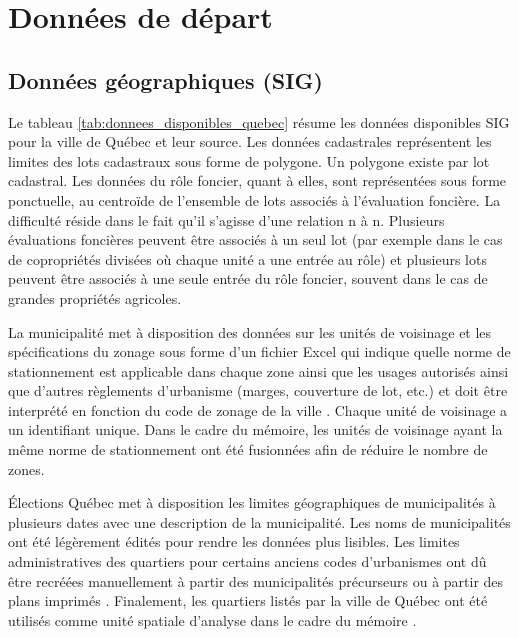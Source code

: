 \section{Données de départ}\label{sec:meth_donnees_dispo}
    \subsection{Données géographiques (SIG)}
        Le tableau \ref{tab:donnees_disponibles_quebec} résume les données disponibles \ac{SIG} pour la ville de Québec et leur source. Les données cadastrales\parencite{ministere_des_ressources_naturelles_et_des_forets_polygones_2023} représentent les limites des lots cadastraux sous forme de polygone. Un polygone existe par lot cadastral. Les données du rôle foncier, quant à elles,  sont représentées sous forme ponctuelle, au centroïde de l'ensemble de lots associés à l'évaluation foncière. La difficulté réside dans le fait qu'il s'agisse d'une relation n à n. Plusieurs évaluations foncières peuvent être associés à un seul lot (par exemple dans le cas de copropriétés divisées où chaque unité a une entrée au rôle) et plusieurs lots peuvent être associés à une seule entrée du rôle foncier, souvent dans le cas de grandes propriétés agricoles. \par
        La municipalité met à disposition des données sur les unités de voisinage \parencite{ville_de_quebec_zonage_2024} et les spécifications du zonage sous forme d'un fichier Excel qui indique quelle norme de stationnement est applicable dans chaque zone ainsi que les usages autorisés ainsi que d'autres règlements d'urbanisme (marges, couverture de lot, etc.) \parencite{ville_de_quebec_grille_2024} et doit être interprété en fonction du code de zonage de la ville \parencite{ville_de_quebec_rvq_2009}. Chaque unité de voisinage a un identifiant unique. Dans le cadre du mémoire, les unités de voisinage ayant la même norme de stationnement ont été fusionnées afin de réduire le nombre de zones.\par
        Élections Québec met à disposition les limites géographiques de municipalités \parencite{elections_quebec_atlas_2021} à plusieurs dates avec une description de la municipalité. Les noms de municipalités ont été légèrement édités pour rendre les données plus lisibles. Les limites administratives des quartiers pour certains anciens codes d'urbanismes ont dû être recréées manuellement à partir des municipalités précurseurs ou à partir des plans imprimés \parencite{ville_de_quebec_reglement_1995}. Finalement, les quartiers listés par la ville de Québec ont été utilisés comme unité spatiale d'analyse dans le cadre du mémoire \parencite{ville_de_quebec_quartiers_2024}.\par
